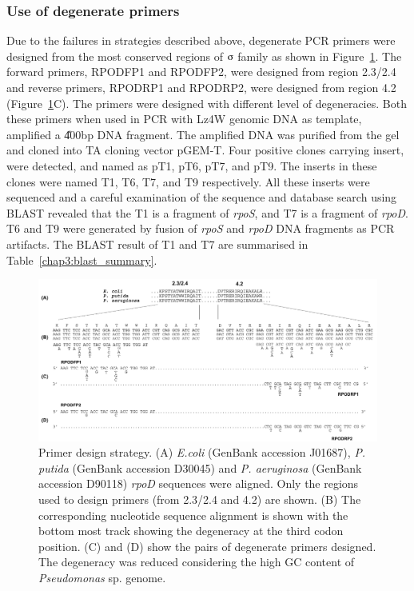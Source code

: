 \subsubsection{Use of degenerate primers}
Due to the failures in strategies described above, degenerate PCR
primers were designed from the most conserved regions of
$\sigmaup$ family as shown in Figure~\ref{chap3:primers}.
The forward primers, RPODFP1 and RPODFP2, were designed from
region 2.3/2.4 and reverse primers, RPODRP1 and RPODRP2, were
designed from region 4.2 (Figure~\ref{chap3:primers}C). The
primers were designed with different level of degeneracies. Both
these primers when used in PCR with Lz4W genomic DNA as template,
amplified a \U{400}{bp} DNA fragment. The amplified DNA was
purified from the gel and cloned into TA cloning vector pGEM-T.
Four positive clones carrying insert, were detected, and named as
pT1, pT6, pT7, and pT9. The inserts in these clones were named T1,
T6, T7, and T9 respectively. All these inserts were sequenced and
a careful examination of the sequence and database search using
BLAST revealed that the T1 is a fragment of \emph{rpoS}, and T7 is
a fragment of \emph{rpoD}. T6 and T9 were generated by fusion of
\emph{rpoS} and \emph{rpoD} DNA fragments as PCR artifacts. The
BLAST result of T1 and T7 are summarised in
Table~\ref{chap3:blast_summary}.

\begin{figure}
\includegraphics{figures/chap3_1}
\caption[Primer design strategy]{Primer design strategy. (A)
\emph{E.coli} (GenBank accession  J01687), \emph{P. putida}
(GenBank accession D30045) and \emph{P. aeruginosa} (GenBank
accession D90118) \emph{rpoD} sequences were aligned. Only the
regions used to design primers (from 2.3/2.4 and 4.2) are shown.
(B) The corresponding nucleotide sequence alignment is shown with
the bottom most track showing the degeneracy at the third codon
position. (C) and (D) show the pairs of degenerate primers
designed. The degeneracy was reduced considering the high GC
content of \emph{Pseudomonas} sp. genome.} \label{chap3:primers}
\end{figure}

